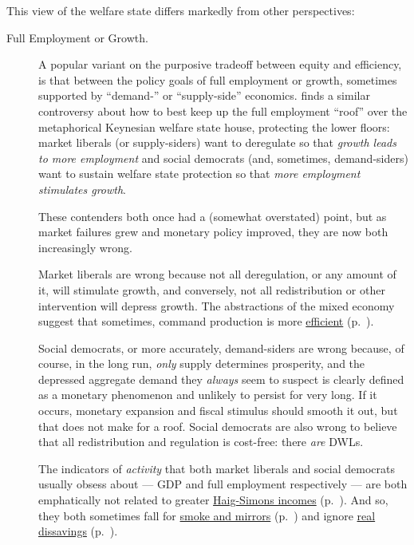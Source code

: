 This view of the welfare state differs markedly from other perspectives:
\begin{description}
	\item[Full Employment or Growth.] A popular variant on the purposive tradeoff between equity and efficiency, is that between the policy goals of full employment or growth, sometimes supported by ``demand-'' or ``supply-side'' economics. %
	\citeauthor{Offe2003} \citeyearpar[453]{Offe2003} finds a similar controversy about how to best keep up the full employment ``roof'' over the metaphorical Keynesian welfare state house, protecting the lower floors: market liberals (or supply-siders) want to deregulate so that \emph{growth leads to more employment} and social democrats (and, sometimes, demand-siders) want to sustain welfare state protection so that \emph{more employment stimulates growth}.

	These contenders both once had a (somewhat overstated) point, but as market failures grew and monetary policy improved, they are now both increasingly wrong.

	Market liberals are wrong because not all deregulation, or any amount of it, will stimulate growth, and conversely, not all redistribution or other intervention will depress growth. The abstractions of the mixed economy suggest that sometimes, command production is more \hyperref[sec:market-failures]{efficient} (p.~\pageref{sec:market-failures}).

	Social democrats, or more accurately, demand-siders are wrong because, of course, in the long run, \emph{only} supply determines prosperity, and the depressed aggregate demand they \emph{always} seem to suspect is clearly defined as a monetary phenomenon and unlikely to persist for very long. If it occurs, monetary expansion and fiscal stimulus should smooth it out, but that does not make for a roof. Social democrats are also wrong to believe that all redistribution and regulation is cost-free: there \emph{are} \glspl{DWL}.

	The indicators of \emph{activity} that both market liberals and social democrats usually obsess about --- \gls{GDP} and full employment respectively --- are both emphatically not related to greater \hyperref[sec:tradeoffs]{Haig-Simons incomes} (p.~\pageref{sec:tradeoffs}). And so, they both sometimes fall for \hyperref[sec:smoke-n-mirrors]{smoke and mirrors} (p.~\pageref{sec:smoke-n-mirrors}) and ignore \hyperref[sec:realdissavings]{real dissavings} (p.~\pageref{sec:realdissavings}). %


\end{description}
